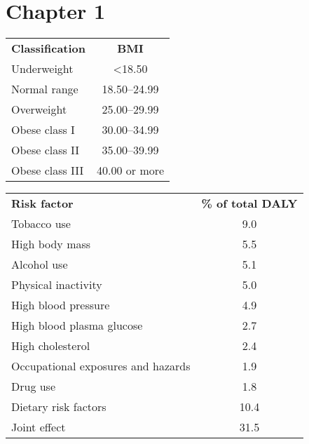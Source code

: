 \chapter{Chapter 1} \label{chap1} 

\bgroup
\def\arraystretch{1.2}
\begin{tabular}{lc}
\toprule
\textbf{Classification} & \textbf{BMI} \\ \cmidrule(lr){1-2}
Underweight & \textless{}18.50 \\
Normal range & 18.50--24.99 \\
Overweight & 25.00--29.99 \\
Obese class I & 30.00--34.99 \\
Obese class II & 35.00--39.99 \\
Obese class III & 40.00 or more \\
\bottomrule
\end{tabular}
\egroup


\bgroup
\def\arraystretch{1.2}
\begin{tabular}{lc}
\toprule
\textbf{Risk factor} & \textbf{\% of total DALY} \\ \cmidrule(lr){1-2}
Tobacco use & 9.0 \\
High body mass & 5.5 \\
Alcohol use & 5.1 \\
Physical inactivity & 5.0 \\
High blood pressure & 4.9 \\
High blood plasma glucose & 2.7 \\
High cholesterol & 2.4 \\
Occupational exposures and hazards & 1.9 \\
Drug use & 1.8 \\
Dietary risk factors & 10.4 \\
Joint effect & 31.5 \\
\bottomrule
\end{tabular}
\egroup

